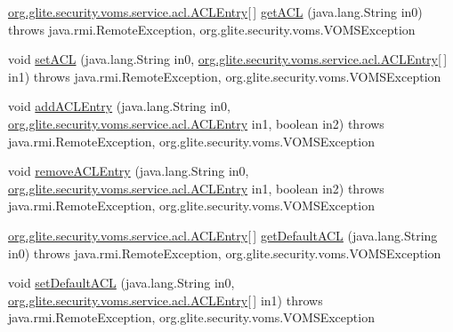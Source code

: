 \begin{DoxyCompactItemize}
\item 
\hyperlink{classorg_1_1glite_1_1security_1_1voms_1_1service_1_1acl_1_1ACLEntry}{org.glite.security.voms.service.acl.ACLEntry}\mbox{[}$\,$\mbox{]} \hyperlink{classorg_1_1glite_1_1security_1_1voms_1_1service_1_1acl_1_1VOMSACLSoapBindingImpl_adfa78affef8afe422b9775010ad07b05}{getACL} (java.lang.String in0)  throws java.rmi.RemoteException, org.glite.security.voms.VOMSException 
\item 
void \hyperlink{classorg_1_1glite_1_1security_1_1voms_1_1service_1_1acl_1_1VOMSACLSoapBindingImpl_a890d9f9122f37a8a0a821f22fcad4c67}{setACL} (java.lang.String in0, \hyperlink{classorg_1_1glite_1_1security_1_1voms_1_1service_1_1acl_1_1ACLEntry}{org.glite.security.voms.service.acl.ACLEntry}\mbox{[}$\,$\mbox{]} in1)  throws java.rmi.RemoteException, org.glite.security.voms.VOMSException 
\item 
void \hyperlink{classorg_1_1glite_1_1security_1_1voms_1_1service_1_1acl_1_1VOMSACLSoapBindingImpl_a20b952ff3aa5a51f9cf2efbf9d42243f}{addACLEntry} (java.lang.String in0, \hyperlink{classorg_1_1glite_1_1security_1_1voms_1_1service_1_1acl_1_1ACLEntry}{org.glite.security.voms.service.acl.ACLEntry} in1, boolean in2)  throws java.rmi.RemoteException, org.glite.security.voms.VOMSException 
\item 
void \hyperlink{classorg_1_1glite_1_1security_1_1voms_1_1service_1_1acl_1_1VOMSACLSoapBindingImpl_a6dbca73bca1a7a1bf9c1545acbe7204f}{removeACLEntry} (java.lang.String in0, \hyperlink{classorg_1_1glite_1_1security_1_1voms_1_1service_1_1acl_1_1ACLEntry}{org.glite.security.voms.service.acl.ACLEntry} in1, boolean in2)  throws java.rmi.RemoteException, org.glite.security.voms.VOMSException 
\item 
\hyperlink{classorg_1_1glite_1_1security_1_1voms_1_1service_1_1acl_1_1ACLEntry}{org.glite.security.voms.service.acl.ACLEntry}\mbox{[}$\,$\mbox{]} \hyperlink{classorg_1_1glite_1_1security_1_1voms_1_1service_1_1acl_1_1VOMSACLSoapBindingImpl_ad9ebbc370e9e08a18b7898b7086ad17f}{getDefaultACL} (java.lang.String in0)  throws java.rmi.RemoteException, org.glite.security.voms.VOMSException 
\item 
void \hyperlink{classorg_1_1glite_1_1security_1_1voms_1_1service_1_1acl_1_1VOMSACLSoapBindingImpl_add3312ee80c4e048dc3d19456e5975ef}{setDefaultACL} (java.lang.String in0, \hyperlink{classorg_1_1glite_1_1security_1_1voms_1_1service_1_1acl_1_1ACLEntry}{org.glite.security.voms.service.acl.ACLEntry}\mbox{[}$\,$\mbox{]} in1)  throws java.rmi.RemoteException, org.glite.security.voms.VOMSException 

\end{DoxyCompactItemize}

